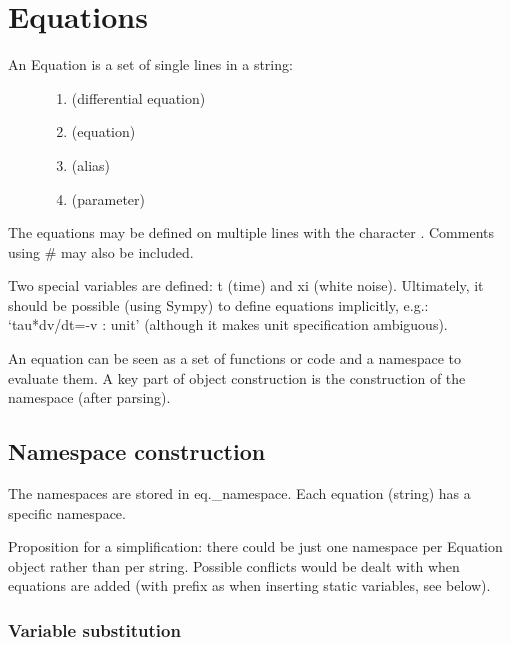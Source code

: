 \documentclass[letterpaper,10pt,english]{manual}
\begin{document}
\section{Equations}
\begin{description}
\item[An Equation is a set of single lines in a string:] \leavevmode\begin{enumerate}
\item {} 
 (differential equation)

\item {} 
 (equation)

\item {} 
 (alias)

\item {} 
 (parameter)

\end{enumerate}

\end{description}

The equations may be defined on multiple lines with the character .
Comments using \# may also be included.

Two special variables are defined: t (time) and xi (white noise).
Ultimately, it should be possible (using Sympy) to define equations implicitly,
e.g.: `tau*dv/dt=-v : unit' (although it makes unit specification ambiguous).

An equation can be seen as a set of functions or code and a namespace to evaluate
them. A key part of object construction is the construction of the namespace
(after parsing).


\subsection{Namespace construction}

The namespaces are stored in eq.\_namespace. Each equation (string) has a specific namespace.

Proposition for a simplification: there could be just one namespace per Equation object rather
than per string. Possible conflicts would be dealt with when equations are added (with prefix
as when inserting static variables, see below).


\subsubsection{Variable substitution}
\end{document}
